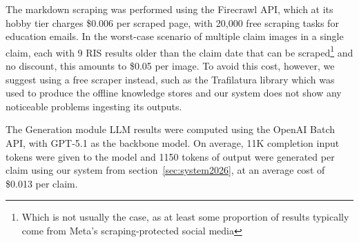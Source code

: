 The markdown scraping was performed using the Firecrawl API, which at its hobby tier charges \$0.006 per scraped page, with 20,000 free scraping tasks for education emails. In the worst-case scenario of multiple claim images in a single claim, each with 9 RIS results older than the claim date that can be scraped\footnote{Which is not usually the case, as at least some proportion of results typically come from Meta's scraping-protected social media} and no discount, this amounts to \$0.05 per image.
To avoid this cost, however, we suggest using a free scraper instead, such as the Trafilatura library which was used to produce the \averitec{} offline knowledge stores and our system does not show any noticeable problems ingesting its outputs.

The Generation module LLM results were computed using the OpenAI Batch API, with GPT-5.1 as the backbone model.
On average, 11K completion input tokens were given to the model and 1150 tokens of output were generated per \averitec{} claim using our system from section~\ref{sec:system2026}, at an average cost of \$0.013 per claim.
